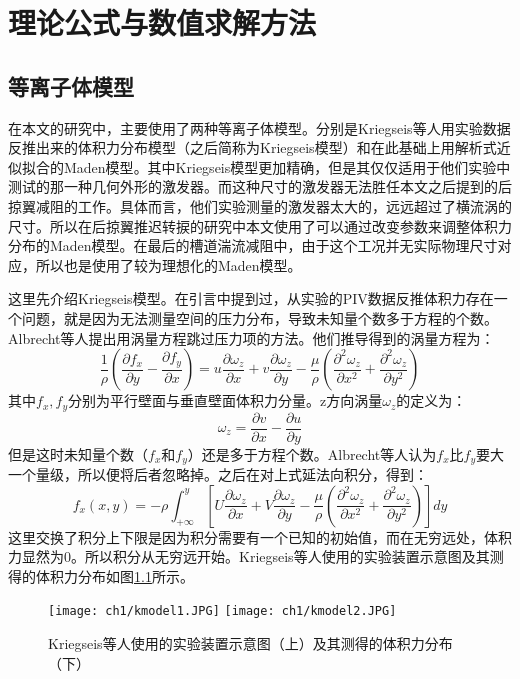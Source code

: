 \chapter{理论公式与数值求解方法}
\label{cha:2}
\section{等离子体模型}
在本文的研究中，主要使用了两种等离子体模型。分别是Kriegseis等人\cite{kriegseis2013velocity}用实验数据反推出来的体积力分布模型（之后简称为Kriegseis模型）和在此基础上用解析式近似拟合的Maden模型\cite{Maden2013}。其中Kriegseis模型更加精确，但是其仅仅适用于他们实验中测试的那一种几何外形的激发器。而这种尺寸的激发器无法胜任本文之后提到的后掠翼减阻的工作。具体而言，他们实验测量的激发器太大的，远远超过了横流涡的尺寸。所以在后掠翼推迟转捩的研究中本文使用了可以通过改变参数来调整体积力分布的Maden模型。在最后的槽道湍流减阻中，由于这个工况并无实际物理尺寸对应，所以也是使用了较为理想化的Maden模型。

这里先介绍Kriegseis模型。在引言中提到过，从实验的PIV数据反推体积力存在一个问题，就是因为无法测量空间的压力分布，导致未知量个数多于方程的个数。Albrecht等人\cite{albrecht2011method}提出用涡量方程跳过压力项的方法。他们推导得到的涡量方程为：
\begin{equation}\label{e:force1}
\frac{1}{\rho} \left( \frac{\partial f_x}{\partial y}-\frac{\partial f_y}{\partial x} \right)=  {u\frac{{\partial \omega_z }}
{{\partial x}} + v\frac{{\partial \omega_z }}
{{\partial y}} - \frac{\mu }
{\rho }\left( {\frac{{\partial ^2 \omega_z }}
{{\partial x^2 }} + \frac{{\partial ^2 \omega_z }}
{{\partial y^2 }}} \right)}
\end{equation}
其中$f_x,f_y$分别为平行壁面与垂直壁面体积力分量。z方向涡量$\omega_z$的定义为：
\begin{equation}\label{e:vorticity}
  \omega_z=\frac{\partial v}{\partial x}-\frac{\partial u}{\partial y}
\end{equation}
但是这时未知量个数（$f_x$和$f_y$）还是多于方程个数。Albrecht等人\cite{albrecht2011method}认为$f_x$比$f_y$要大一个量级，所以便将后者忽略掉。之后在对上式延法向积分，得到：
\begin{equation}\label{e:force3}
f_x(x,y) =  - \rho \int_{+\infty} ^y {\left[ {U\frac{{\partial \omega_z }}
{{\partial x}} + V\frac{{\partial \omega_z }}
{{\partial y}} - \frac{\mu }
{\rho }\left( {\frac{{\partial ^2 \omega_z }}
{{\partial x^2 }} + \frac{{\partial ^2 \omega_z }}
{{\partial y^2 }}} \right)} \right]dy}
\end{equation}
这里交换了积分上下限是因为积分需要有一个已知的初始值，而在无穷远处，体积力显然为0。所以积分从无穷远开始。Kriegseis等人\cite{kriegseis2013velocity}使用的实验装置示意图及其测得的体积力分布如图\ref{f:kmodel}所示。
\begin{figure}
  \centering
  \texttt{[image: ch1/kmodel1.JPG]}
  \texttt{[image: ch1/kmodel2.JPG]}
  \caption{Kriegseis等人\cite{kriegseis2013velocity}使用的实验装置示意图（上）及其测得的体积力分布（下）}\label{f:kmodel}
\end{figure}

